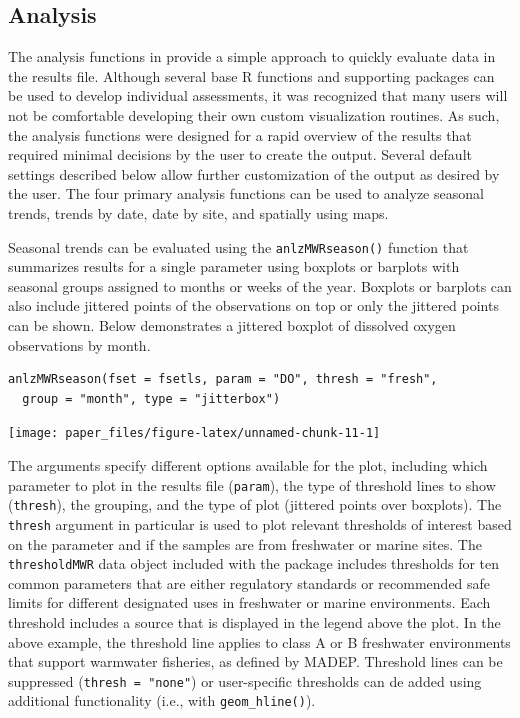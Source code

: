 \hypertarget{analysis}{%
\subsection{Analysis}\label{analysis}}

The analysis functions in  provide a simple approach to quickly evaluate data in the results file. Although several base R functions and supporting packages can be used to develop individual assessments, it was recognized that many users will not be comfortable developing their own custom visualization routines. As such, the analysis functions were designed for a rapid overview of the results that required minimal decisions by the user to create the output. Several default settings described below allow further customization of the output as desired by the user. The four primary analysis functions can be used to analyze seasonal trends, trends by date, date by site, and spatially using maps.

Seasonal trends can be evaluated using the \texttt{anlzMWRseason()} function that summarizes results for a single parameter using boxplots or barplots with seasonal groups assigned to months or weeks of the year. Boxplots or barplots can also include jittered points of the observations on top or only the jittered points can be shown. Below demonstrates a jittered boxplot of dissolved oxygen observations by month.

\begin{verbatim}
anlzMWRseason(fset = fsetls, param = "DO", thresh = "fresh", 
  group = "month", type = "jitterbox")
\end{verbatim}

\texttt{[image: paper\_files/figure-latex/unnamed-chunk-11-1]}

The arguments specify different options available for the plot, including which parameter to plot in the results file (\texttt{param}), the type of threshold lines to show (\texttt{thresh}), the grouping, and the type of plot (jittered points over boxplots). The \texttt{thresh} argument in particular is used to plot relevant thresholds of interest based on the parameter and if the samples are from freshwater or marine sites. The \texttt{thresholdMWR} data object included with the package includes thresholds for ten common parameters that are either regulatory standards or recommended safe limits for different designated uses in freshwater or marine environments. Each threshold includes a source that is displayed in the legend above the plot. In the above example, the threshold line applies to class A or B freshwater environments that support warmwater fisheries, as defined by MADEP. Threshold lines can be suppressed (\texttt{thresh\ =\ "none"}) or user-specific thresholds can de added using additional  functionality (i.e., with \texttt{geom\_hline()}).

